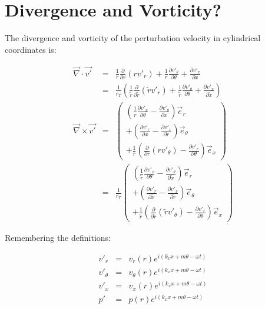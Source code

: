 \documentclass[12pt]{article}
\begin{document}
\section{Divergence and Vorticity?}

The divergence and vorticity of the perturbation velocity in cylindrical
coordinates is:

\begin{eqnarray}
\vec{\nabla} \cdot \vec{v'} &=&
\frac{1}{r}
\frac{\partial}{\partial r} \left( r v'_r \right)
+ \frac{1}{r} \frac{\partial v'_{\theta}}{\partial \theta}
+ \frac{\partial v'_{x}}{\partial x}
\nonumber
\\
&=&
\frac{1}{r_T}
\left(
\frac{1}{\widetilde{r}}
\frac{\partial}{\partial \widetilde{r}} 
\left( \widetilde{r} v'_r \right)
+ 
 \frac{1}{\widetilde{r}} 
\frac{\partial v'_{\theta}}{\partial \theta}
+ 
 \frac{\partial v'_{x}}{\partial \widetilde{x}}
\right)
\nonumber
\\
\vec{\nabla} \times \vec{v'}
&=&
\left(
\begin{array}{r}
\left(
\frac{1}{r} \frac{\partial v'_x}{\partial \theta}
-\frac{\partial v'_{\theta}}{\partial x} 
\right) \vec{e}_r
\\
+\left(
\frac{\partial v'_r}{\partial x}
-\frac{\partial v'_x}{\partial r}
\right) \vec{e}_{\theta}
\\
+
\frac{1}{r} 
\left(
  \frac{\partial}{\partial r} \left(r v'_{\theta} \right)
- \frac{\partial v'_r}{\partial \theta}
\right) \vec{e}_x
\end{array}
\right)
\nonumber
\\
&=&
\frac{1}{r_T}
\left(
\begin{array}{r}
\left(
\frac{1}{\widetilde{r}} \frac{\partial v'_x}{\partial \theta}
-\frac{\partial v'_{\theta}}{\partial \widetilde{x}} 
\right) \vec{e}_r
\\
+\left(
\frac{\partial v'_r}{\partial \widetilde{x}}
-\frac{\partial v'_x}{\partial \widetilde{r}}
\right) \vec{e}_{\theta}
\\
+
\frac{1}{\widetilde{r}} 
\left(
  \frac{\partial}{\partial \widetilde{r}} \left(\widetilde{r} v'_{\theta} \right)
- \frac{\partial v'_r}{\partial \theta}
\right) \vec{e}_x
\end{array}
\right)
\nonumber
\end{eqnarray}

Remembering the definitions:

\begin{eqnarray}
v'_r &=& v_r \left(r \right) e^{i \left(k_x x + m \theta - \omega t \right)}
\nonumber
\\
v'_{\theta} &=& v_{\theta} \left(r \right) e^{i \left(k_x x + m \theta - \omega t \right)}
\nonumber
\\
v'_x &=& v_x \left(r \right) e^{i \left(k_x x + m \theta - \omega t \right)}
\nonumber
\\
p' &=& p \left(r \right) e^{i \left(k_x x + m \theta - \omega t \right)}
\nonumber
\end{eqnarray}
\end{document}
